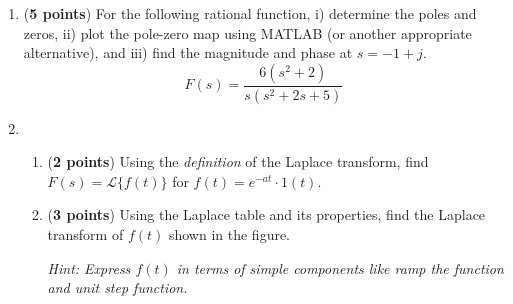 \documentclass[]{article}
\begin{document}
\begin{enumerate}

    \item (\textbf{5 points}) For the following rational function, i) determine the poles and zeros, ii) plot the pole-zero map using MATLAB (or another appropriate alternative), and iii) find the magnitude and phase at $s=-1+j$.
    $$F(s)=\frac{6(s^2+2)}{s(s^2+2s+5)}$$
    \vspace{0.2 cm}

    \item
    \begin{enumerate}
        \item (\textbf{2 points}) Using the \textit{definition} of the Laplace transform, find $F(s)=\mathcal{L}\{f(t)\}$ for $f(t)=e^{-at}\cdot1(t)$.
        \item (\textbf{3 points}) Using the Laplace table and its properties, find the Laplace transform of $f(t)$ shown in the figure.
        \begin{center}
        \end{center}
        \textit{Hint: Express $f(t)$ in terms of simple components like ramp the function and unit step function.}
    \end{enumerate}
    \vspace{0.4 cm}


\end{enumerate}
\end{document}
